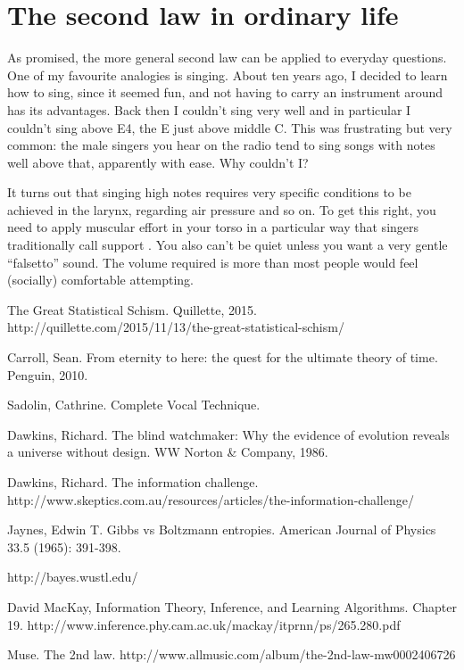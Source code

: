 \documentclass[a4paper, 12pt]{article}
\begin{document}
\section*{The second law in ordinary life}
As promised, the more general second law can be applied to everyday questions.
One of my favourite analogies is singing. About ten years ago, I decided to
learn how to sing, since it seemed fun, and not having to carry an instrument
around has its advantages. Back then I couldn't sing very well and in particular
I couldn't sing above E4, the E just above middle C. This was frustrating but
very common: the male singers you hear on the radio tend to sing songs with
notes well above that, apparently with ease. Why couldn't I?

It turns out that singing high notes requires very specific conditions to be
achieved in the larynx, regarding air pressure and so on. To get this right,
you need to apply muscular effort in your torso in a particular way that singers
traditionally call support \citep{cvt}. You also can't be quiet unless you want
a very gentle ``falsetto'' sound. The volume required is more than most people
would feel (socially) comfortable attempting.

\begin{thebibliography}{999} %
 The Great Statistical Schism. Quillette, 2015.
http://quillette.com/2015/11/13/the-great-statistical-schism/

Carroll, Sean. From eternity to here: the quest for the ultimate theory of time. Penguin, 2010.

Sadolin, Cathrine. Complete Vocal Technique.

Dawkins, Richard. The blind watchmaker: Why the evidence of evolution reveals a universe without design. WW Norton \& Company, 1986.

Dawkins, Richard. The information challenge.
http://www.skeptics.com.au/resources/articles/the-information-challenge/

Jaynes, Edwin T.
Gibbs vs Boltzmann entropies. American Journal of Physics 33.5 (1965): 391-398.

http://bayes.wustl.edu/

David MacKay, Information Theory, Inference, and Learning Algorithms.
Chapter 19.
http://www.inference.phy.cam.ac.uk/mackay/itprnn/ps/265.280.pdf

Muse. The 2nd law.
http://www.allmusic.com/album/the-2nd-law-mw0002406726
\end{thebibliography}
\end{document}

